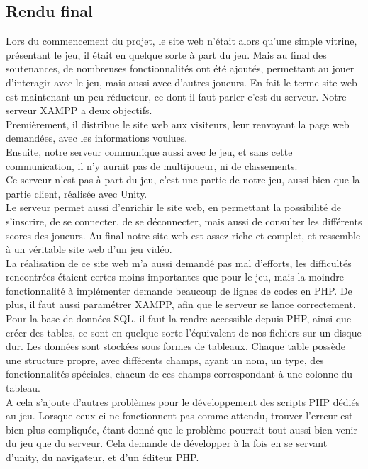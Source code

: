 \documentclass[12pt]{article}
\begin{document}
\subsection{Rendu final}

Lors du commencement du projet, le site web n'était alors qu'une simple vitrine, présentant le jeu, il était en quelque sorte à part du jeu. Mais au final des soutenances, de nombreuses fonctionnalités ont été ajoutés, permettant au jouer d'interagir avec le jeu, mais aussi avec d'autres joueurs. En fait le terme site web est maintenant un peu réducteur, ce dont il faut parler c'est du serveur. Notre serveur XAMPP \cite{xampp} a deux objectifs.\\
Premièrement, il distribue le site web aux visiteurs, leur renvoyant la page web demandées, avec les informations voulues.\\
Ensuite, notre serveur communique aussi avec le jeu, et sans cette communication, il n'y aurait pas de multijoueur, ni de classements.\\
Ce serveur n'est pas à part du jeu, c'est une partie de notre jeu, aussi bien que la partie client, réalisée avec Unity.\\

Le serveur permet aussi d'enrichir le site web, en permettant la possibilité de s'inscrire, de se connecter, de se déconnecter, mais aussi de consulter les différents scores des joueurs. Au final notre site web est assez riche et complet, et ressemble à un véritable site web d'un jeu vidéo.\\

La réalisation de ce site web m'a aussi demandé pas mal d'efforts, les difficultés rencontrées étaient certes moins importantes que pour le jeu, mais la moindre fonctionnalité à implémenter demande beaucoup de lignes de codes en \gls{PHP}. De plus, il faut aussi paramétrer XAMPP, afin que le serveur se lance correctement. Pour la base de données \gls{SQL}, il faut la rendre accessible depuis PHP, ainsi que créer des tables, ce sont en quelque sorte l'équivalent de nos fichiers sur un disque dur. Les données sont stockées sous formes de tableaux. Chaque table possède une structure propre, avec différents champs, ayant un nom, un type, des fonctionnalités spéciales, chacun de ces champs correspondant à une colonne du tableau.\\
A cela s'ajoute d'autres problèmes pour le développement des scripts PHP dédiés au jeu. Lorsque ceux-ci ne fonctionnent pas comme attendu, trouver l'erreur est bien plus compliquée, étant donné que le problème pourrait tout aussi bien venir du jeu que du serveur. Cela demande de développer à la fois en se servant d'unity, du navigateur, et d'un éditeur PHP.
\end{document}
